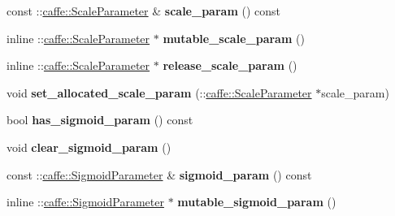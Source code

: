 \begin{DoxyCompactItemize}
const \+::\mbox{\hyperlink{classcaffe_1_1_scale_parameter}{caffe\+::\+Scale\+Parameter}} \& {\bfseries scale\+\_\+param} () const
\item 
\mbox{\label{classcaffe_1_1_layer_parameter_ae098e7d1ce5d4a7b7c9f60bd40bb1a22}} 
inline \+::\mbox{\hyperlink{classcaffe_1_1_scale_parameter}{caffe\+::\+Scale\+Parameter}} $\ast$ {\bfseries mutable\+\_\+scale\+\_\+param} ()
\item 
\mbox{\label{classcaffe_1_1_layer_parameter_a2065267fa7351a6bd65cb8f88806ce5e}} 
inline \+::\mbox{\hyperlink{classcaffe_1_1_scale_parameter}{caffe\+::\+Scale\+Parameter}} $\ast$ {\bfseries release\+\_\+scale\+\_\+param} ()
\item 
\mbox{\label{classcaffe_1_1_layer_parameter_a943a6b72c8e7e94ac112471743b20f7f}} 
void {\bfseries set\+\_\+allocated\+\_\+scale\+\_\+param} (\+::\mbox{\hyperlink{classcaffe_1_1_scale_parameter}{caffe\+::\+Scale\+Parameter}} $\ast$scale\+\_\+param)
\item 
\mbox{\label{classcaffe_1_1_layer_parameter_ab15eb50f7589bc083b5bcdd4d42ea9ca}} 
bool {\bfseries has\+\_\+sigmoid\+\_\+param} () const
\item 
\mbox{\label{classcaffe_1_1_layer_parameter_af33c6881cd37c6b577822990b0d762f1}} 
void {\bfseries clear\+\_\+sigmoid\+\_\+param} ()
\item 
\mbox{\label{classcaffe_1_1_layer_parameter_a606b26cf8e8226247f7bfe529e70d853}} 
const \+::\mbox{\hyperlink{classcaffe_1_1_sigmoid_parameter}{caffe\+::\+Sigmoid\+Parameter}} \& {\bfseries sigmoid\+\_\+param} () const
\item 
\mbox{\label{classcaffe_1_1_layer_parameter_aea4960c02818a03ec75855d6e25a813c}} 
inline \+::\mbox{\hyperlink{classcaffe_1_1_sigmoid_parameter}{caffe\+::\+Sigmoid\+Parameter}} $\ast$ {\bfseries mutable\+\_\+sigmoid\+\_\+param} ()
\item 
\mbox{\label{classcaffe_1_1_layer_parameter_a80a90eefb837e575b28eeab873399168}} 

\end{DoxyCompactItemize}
